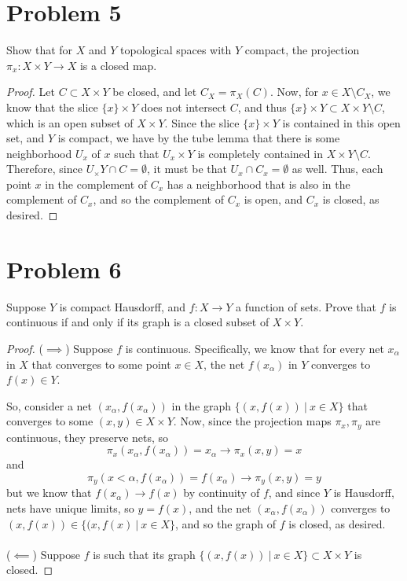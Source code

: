 \documentclass[fontsize=11pt]{scrartcl} %
\numberwithin{equation}{section} %
\numberwithin{figure}{section} %
\numberwithin{table}{section} %
\begin{document}
\section*{Problem 5}
Show that for $X$ and $Y$ topological spaces with $Y$ compact, the projection
$\pi_x:X\times Y\to X$ is a closed map.
\\
\begin{proof}
    Let $C\subset X\times Y$ be closed, and let $C_X = \pi_X(C)$. Now, for $x\in
    X\setminus C_X$, we know that the slice $\{x\}\times Y$ does not intersect
    $C$, and thus $\{x\}\times Y\subset X\times Y\setminus C$, which is an open
    subset of $X\times Y$. Since the slice $\{x\}\times Y$ is contained in this
    open set, and $Y$ is compact, we have by the tube lemma that there is some
    neighborhood $U_x$ of $x$ such that $U_x\times Y$ is completely contained in
    $X\times Y\setminus C$. Therefore, since $U_\times Y\cap C = \emptyset$, it
    must be that $U_x\cap C_x = \emptyset$ as well. Thus, each point $x$ in the
    complement of $C_x$ has a neighborhood that is also in the complement of
    $C_x$, and so the complement of $C_x$ is open, and $C_x$ is closed, as
    desired.
\end{proof}

\section*{Problem 6}
Suppose $Y$ is compact Hausdorff, and $f:X\to Y$ a function of sets. Prove that
$f$ is continuous if and only if its graph is a closed subset of $X\times Y$.
\\
\begin{proof}
    ($\implies$)
    Suppose $f$ is continuous. Specifically, we know that for every net $x_{\alpha}$
    in $X$ that converges to some point $x\in X$, the net $f(x_{\alpha})$
    in $Y$ converges to $f(x)\in Y$.

    So, consider a net $(x_{\alpha},f(x_{\alpha}))$ in the graph $\{(x,f(x))\ |\
    x\in X\}$ that converges to some $(x,y)\in X\times Y$. Now, since the
    projection maps $\pi_x,\pi_y$ are continuous, they preserve nets, so
    \[
        \pi_x(x_{\alpha},f(x_{\alpha})) = x_{\alpha} \to \pi_x(x,y)=x
    \]
    and
    \[
        \pi_y(x<{\alpha},f(x_{\alpha})) = f(x_{\alpha}) \to \pi_y(x,y) = y
    \]
    but we know that $f(x_{\alpha})\to f(x)$ by continuity of $f$, and since $Y$
    is Hausdorff, nets have unique limits, so $y=f(x)$, and the net
    $(x_{\alpha},f(x_{\alpha}))$ converges to $(x,f(x))\in \{(x,f(x)\ |\ x\in
    X\}$, and so the graph of $f$ is closed, as desired.
    \\
    \\
    ($\impliedby$)
    Suppose $f$ is such that its graph $\{(x,f(x))\ |\ x\in X\}\subset X\times
    Y$ is closed.
\end{proof}
\end{document}
